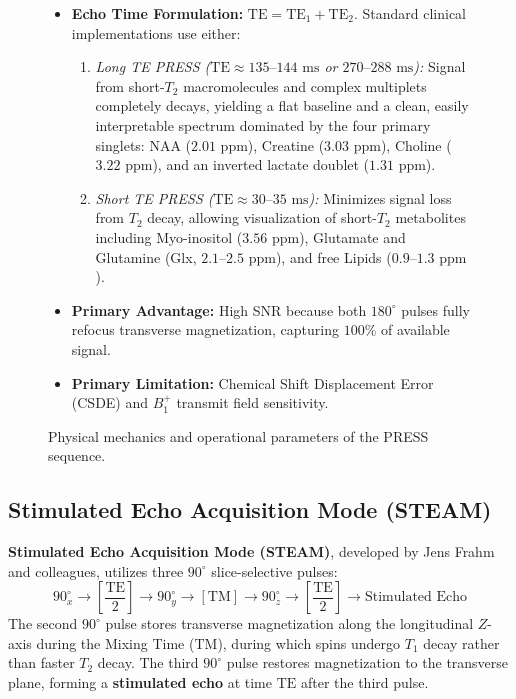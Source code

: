 \documentclass[11pt,a4paper]{article}
\begin{document}
\begin{figure}[htbp]
\centering
\begin{tcolorbox}[colback=blue!5!white,colframe=blue!60!black,title=\textbf{Localization Architecture of the PRESS Pulse Sequence},width=\linewidth]
\small
\begin{itemize}[leftmargin=1.5em]
    \item \textbf{Echo Time Formulation:} $\text{TE} = \text{TE}_1 + \text{TE}_2$. Standard clinical implementations use either:
    \begin{enumerate}
        \item \textit{Long TE PRESS ($\text{TE} \approx 135\text{--}144\text{ ms}$ or $270\text{--}288\text{ ms}$):} Signal from short-$T_2$ macromolecules and complex multiplets completely decays, yielding a flat baseline and a clean, easily interpretable spectrum dominated by the four primary singlets: NAA ($2.01\text{ ppm}$), Creatine ($3.03\text{ ppm}$), Choline ($3.22\text{ ppm}$), and an inverted lactate doublet ($1.31\text{ ppm}$).
        \item \textit{Short TE PRESS ($\text{TE} \approx 30\text{--}35\text{ ms}$):} Minimizes signal loss from $T_2$ decay, allowing visualization of short-$T_2$ metabolites including Myo-inositol ($3.56\text{ ppm}$), Glutamate and Glutamine (Glx, $2.1\text{--}2.5\text{ ppm}$), and free Lipids ($0.9\text{--}1.3\text{ ppm}$).
    \end{enumerate}
    \item \textbf{Primary Advantage:} High SNR because both $180^\circ$ pulses fully refocus transverse magnetization, capturing $100\%$ of available signal.
    \item \textbf{Primary Limitation:} Chemical Shift Displacement Error (CSDE) and $B_1^+$ transmit field sensitivity.
\end{itemize}
\end{tcolorbox}
\caption{Physical mechanics and operational parameters of the PRESS sequence.}
\label{fig:press_sequence}
\end{figure}

\subsection{Stimulated Echo Acquisition Mode (STEAM)}
\textbf{Stimulated Echo Acquisition Mode (STEAM)}, developed by Jens Frahm and colleagues, utilizes three $90^\circ$ slice-selective pulses:
\begin{equation}
    90^\circ_x \longrightarrow \left[ \frac{\text{TE}}{2} \right] \longrightarrow 90^\circ_y \longrightarrow [\text{TM}] \longrightarrow 90^\circ_z \longrightarrow \left[ \frac{\text{TE}}{2} \right] \longrightarrow \text{Stimulated Echo}
\end{equation}
The second $90^\circ$ pulse stores transverse magnetization along the longitudinal $Z$-axis during the Mixing Time ($\text{TM}$), during which spins undergo $T_1$ decay rather than faster $T_2$ decay. The third $90^\circ$ pulse restores magnetization to the transverse plane, forming a \textbf{stimulated echo} at time $\text{TE}$ after the third pulse.
\end{document}
